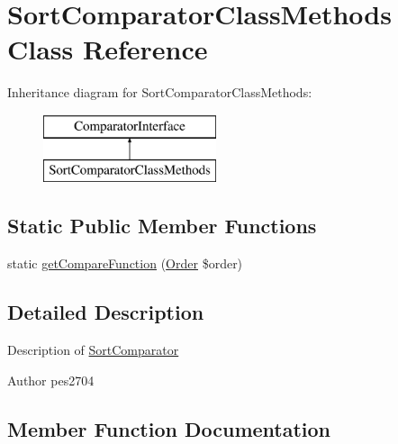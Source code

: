 \hypertarget{class_pes_1_1_comparator_1_1_sort_comparator_class_methods}{}\section{Sort\+Comparator\+Class\+Methods Class Reference}
\label{class_pes_1_1_comparator_1_1_sort_comparator_class_methods}
Inheritance diagram for Sort\+Comparator\+Class\+Methods\+:\begin{figure}[H]
\begin{center}
\leavevmode
\includegraphics[height=2.000000cm]{class_pes_1_1_comparator_1_1_sort_comparator_class_methods}
\end{center}
\end{figure}
\subsection*{Static Public Member Functions}
\begin{DoxyCompactItemize}
\item 
static \mbox{\hyperlink{class_pes_1_1_comparator_1_1_sort_comparator_class_methods_a21aeb75d37fce6724b5a60f836dfc85c}{get\+Compare\+Function}} (\mbox{\hyperlink{class_pes_1_1_query_1_1_order}{Order}} \$order)
\end{DoxyCompactItemize}


\subsection{Detailed Description}
Description of \mbox{\hyperlink{class_pes_1_1_comparator_1_1_sort_comparator}{Sort\+Comparator}}

\begin{DoxyAuthor}{Author}
pes2704 
\end{DoxyAuthor}


\subsection{Member Function Documentation}
\mbox{\label{class_pes_1_1_comparator_1_1_sort_comparator_class_methods_a21aeb75d37fce6724b5a60f836dfc85c}} 

